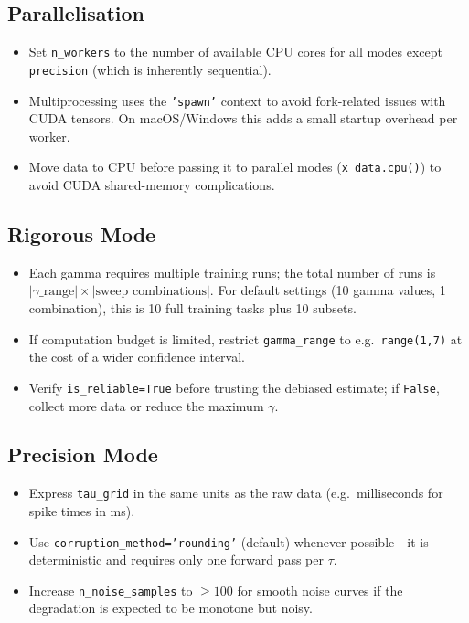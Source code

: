\documentclass[12pt]{article}
\newcommand{\api}[1]{\texttt{#1}}
\begin{document}
\subsection{Parallelisation}

\begin{itemize}[leftmargin=*]
  \item Set \api{n\_workers} to the number of available CPU cores for all
        modes except \api{precision} (which is inherently sequential).
  \item Multiprocessing uses the \api{'spawn'} context to avoid fork-related
        issues with CUDA tensors.  On macOS/Windows this adds a small
        startup overhead per worker.
  \item Move data to CPU before passing it to parallel modes
        (\api{x\_data.cpu()}) to avoid CUDA shared-memory complications.
\end{itemize}

\subsection{Rigorous Mode}

\begin{itemize}[leftmargin=*]
  \item Each gamma requires multiple training runs; the total number of runs
        is $|\gamma\_\mathrm{range}| \times |\text{sweep combinations}|$.
        For default settings (10 gamma values, 1 combination), this is 10
        full training tasks plus 10 subsets.
  \item If computation budget is limited, restrict \api{gamma\_range} to
        e.g.\ \api{range(1,7)} at the cost of a wider confidence interval.
  \item Verify \api{is\_reliable=True} before trusting the debiased
        estimate; if \api{False}, collect more data or reduce the maximum
        $\gamma$.
\end{itemize}

\subsection{Precision Mode}

\begin{itemize}[leftmargin=*]
  \item Express \api{tau\_grid} in the same units as the raw data (e.g.\
        milliseconds for spike times in ms).
  \item Use \api{corruption\_method='rounding'} (default) whenever
        possible—it is deterministic and requires only one forward pass per
        $\tau$.
  \item Increase \api{n\_noise\_samples} to $\ge 100$ for smooth noise
        curves if the degradation is expected to be monotone but noisy.
\end{itemize}
\end{document}
